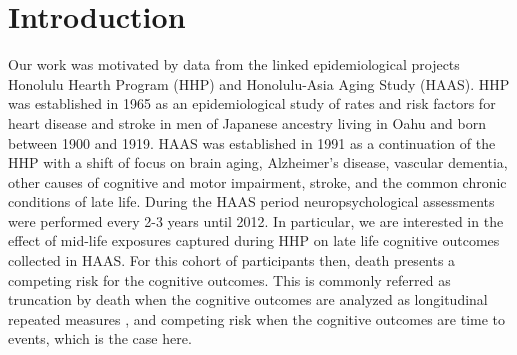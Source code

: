\documentclass[11pt]{article}
\begin{document}
%
\newpage
\section{Introduction}
\label{s:intro}

Our work was motivated by data from the linked epidemiological projects Honolulu Hearth Program (HHP) and Honolulu-Asia Aging Study (HAAS). HHP was established in 1965 as an epidemiological study of rates and risk factors for heart disease and stroke in men of Japanese ancestry living in Oahu and born between 1900 and 1919. 
HAAS was established in 1991 %
 as a continuation of the HHP with a shift of focus on brain aging, Alzheimer's disease, vascular dementia, other causes of cognitive and motor impairment, stroke, and the common chronic conditions of late life. %
During  the HAAS period  neuropsychological assessments were performed every 2-3 years until 2012. 
In particular, we are interested in the 
 effect of mid-life exposures captured during HHP on late life cognitive outcomes collected in HAAS. 
 For this cohort of participants then, death presents a competing risk for the cognitive outcomes. 
 This is commonly referred as truncation by death when the cognitive outcomes are analyzed as longitudinal repeated measures \citep{ding2011identifiability,tchetgen2014identification,estes2016time,yang2016using}, and competing risk when the cognitive outcomes are time to events, which is the case here.
\end{document}

